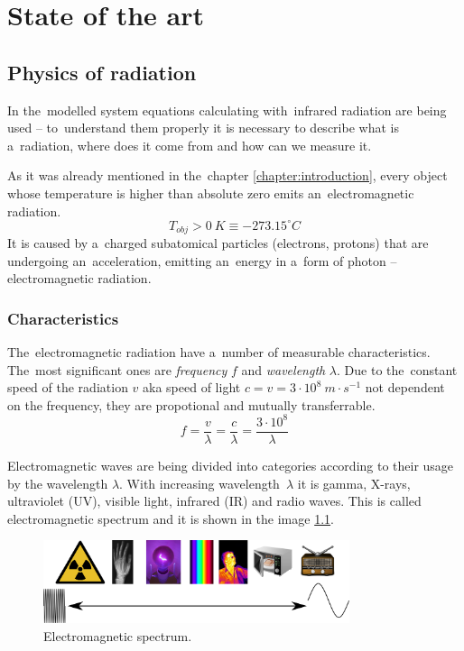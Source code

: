 \chapter{State of the art}
\label{theory}


\section{Physics of radiation}

In the~modelled system equations calculating with~infrared radiation are being used -- to~understand
them properly it is necessary to describe what is a~radiation, where does it come from and how can
we measure it. 

As it was already mentioned in the~chapter \ref{chapter:introduction}, every object whose temperature
is higher than absolute zero emits an~electromagnetic radiation.
\begin{equation}
T_{obj}>0~K\equiv -273.15^{\circ}C
\end{equation}
It is caused by a~charged subatomical particles (electrons, protons) that are undergoing an~acceleration,
emitting an~energy in a~form of photon -- electromagnetic radiation.


\subsection*{Characteristics}
The~electromagnetic radiation have a~number of measurable characteristics. The~most significant ones
are {\it frequency} $f$ and {\it wavelength} $\lambda$. Due to the~constant speed of the radiation $v$
aka speed of light $c = v = 3\cdot10^{8}~m\cdot s^{-1}$ not dependent on the frequency, they are
propotional and mutually transferrable.
\begin{equation}
f=\frac{v}{\lambda}=\frac{c}{\lambda}=\frac{3\cdot10^{8}}{\lambda}
\end{equation}

Electromagnetic waves are being divided into categories according to their usage by the wavelength
$\lambda$. With increasing wavelength~$\lambda$ it is gamma, X-rays, ultraviolet (UV), visible light,
infrared (IR) and radio waves. This is called electromagnetic spectrum and it is shown in the image
\ref{fig:spectrum}.

\begin{figure}
\begin{center}
\includegraphics[width=0.8\textwidth]{img/spectrum.png}
\caption{Electromagnetic spectrum.\label{fig:spectrum}}
\end{center}    
\end{figure}

